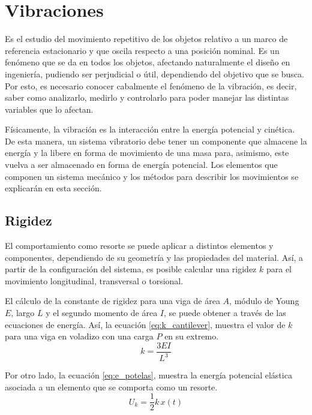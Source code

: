 \section{Vibraciones}
Es el estudio del movimiento repetitivo de los objetos relativo a un marco de referencia estacionario y que oscila respecto a una posición nominal. Es un fenómeno que se da en todos los objetos, afectando naturalmente el diseño en ingeniería, pudiendo ser perjudicial o útil, dependiendo del objetivo que se busca. Por esto, es necesario conocer cabalmente el fenómeno de la vibración, es decir, saber como analizarlo, medirlo y controlarlo para poder manejar las distintas variables que lo afectan.

Físicamente, la vibración es la interacción entre la energía potencial y cinética. De esta manera, un sistema vibratorio debe tener un componente que almacene la energía y la libere en forma de movimiento de una masa para, asimismo, este vuelva a ser almacenado en forma de energía potencial. Los elementos que componen un sistema mecánico y los métodos para describir los movimientos se explicarán en esta sección.


\subsection{Rigidez}
El comportamiento como resorte se puede aplicar a distintos elementos y componentes, dependiendo de su geometría y las propiedades del material. Así, a partir de la configuración del sistema, es posible calcular una rigidez $k$ para el movimiento longitudinal, transversal o torsional. 

El cálculo de la constante de rigidez para una viga de área $A$, módulo de Young $E$, largo $L$ y el segundo momento de área $I$, se puede obtener a través de las ecuaciones de energía. Así, la ecuación \ref{eq:k_cantilever}, muestra el valor de $k$ para una viga en voladizo con una carga $P$ en su extremo.
\begin{equation}\label{eq:k_cantilever}
	k = \frac{3EI}{L^3}
\end{equation}

Por otro lado, la ecuación \ref{eq:e_potelas}, muestra la energía potencial elástica asociada a un elemento que se comporta como un resorte.
\begin{equation}\label{eq:e_potelas}
	U_k = \frac{1}{2}k\,x(t)
\end{equation}


